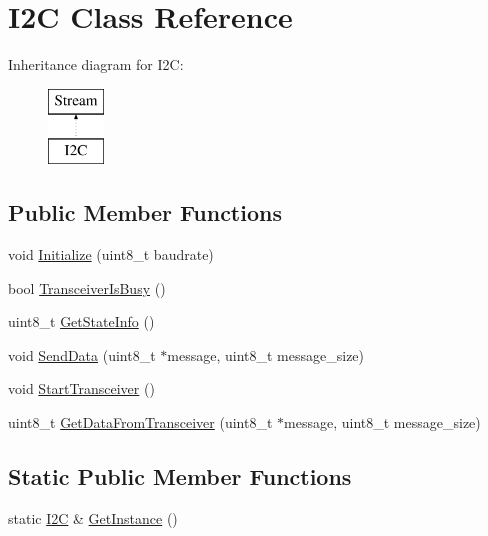 \hypertarget{class_i2_c}{}\section{I2C Class Reference}
\label{class_i2_c}
Inheritance diagram for I2C\+:\begin{figure}[H]
\begin{center}
\leavevmode
\includegraphics[height=2.000000cm]{class_i2_c}
\end{center}
\end{figure}
\subsection*{Public Member Functions}
\begin{DoxyCompactItemize}
\item 
void \hyperlink{class_i2_c_acfdd142a63b224f178f3edda5f30f2aa}{Initialize} (uint8\+\_\+t baudrate)
\item 
bool \hyperlink{class_i2_c_a3e6747576e7d4abf506296f8675ec3b5}{Transceiver\+Is\+Busy} ()
\item 
uint8\+\_\+t \hyperlink{class_i2_c_ac46dd0197fdfbea2ff6d24b45f2ec67b}{Get\+State\+Info} ()
\item 
void \hyperlink{class_i2_c_a6b0a26e4ebcae7eee8920a70b77fd5c2}{Send\+Data} (uint8\+\_\+t $\ast$message, uint8\+\_\+t message\+\_\+size)
\item 
void \hyperlink{class_i2_c_af8c970cb20a2b5bdcf80ef35c662658f}{Start\+Transceiver} ()
\item 
uint8\+\_\+t \hyperlink{class_i2_c_a2023e5108a9bfb4ac09f509f74137307}{Get\+Data\+From\+Transceiver} (uint8\+\_\+t $\ast$message, uint8\+\_\+t message\+\_\+size)
\end{DoxyCompactItemize}
\subsection*{Static Public Member Functions}
\begin{DoxyCompactItemize}
\item 
static \hyperlink{class_i2_c}{I2C} \& \hyperlink{class_i2_c_ade3b5d971432c82867201123965cf3fd}{Get\+Instance} ()
\end{DoxyCompactItemize}

